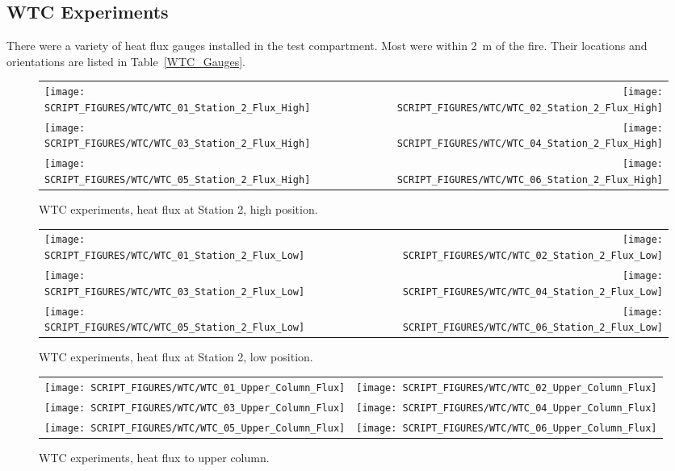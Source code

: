 \clearpage

\subsection{WTC Experiments}

There were a variety of heat flux gauges installed in the test compartment. Most were within 2~m of the fire. Their locations and orientations are listed in Table~\ref{WTC_Gauges}.


\begin{figure}[h!]
\begin{tabular*}{\textwidth}{l@{\extracolsep{\fill}}r}
\texttt{[image: SCRIPT\_FIGURES/WTC/WTC\_01\_Station\_2\_Flux\_High]} &
\texttt{[image: SCRIPT\_FIGURES/WTC/WTC\_02\_Station\_2\_Flux\_High]} \\
\texttt{[image: SCRIPT\_FIGURES/WTC/WTC\_03\_Station\_2\_Flux\_High]} &
\texttt{[image: SCRIPT\_FIGURES/WTC/WTC\_04\_Station\_2\_Flux\_High]} \\
\texttt{[image: SCRIPT\_FIGURES/WTC/WTC\_05\_Station\_2\_Flux\_High]} &
\texttt{[image: SCRIPT\_FIGURES/WTC/WTC\_06\_Station\_2\_Flux\_High]}
\end{tabular*}
\caption{WTC experiments, heat flux at Station 2, high position.}
\label{NIST_WTC_Station_2_Flux_High}
\end{figure}

\newpage

\begin{figure}[p]
\begin{tabular*}{\textwidth}{l@{\extracolsep{\fill}}r}
\texttt{[image: SCRIPT\_FIGURES/WTC/WTC\_01\_Station\_2\_Flux\_Low]} &
\texttt{[image: SCRIPT\_FIGURES/WTC/WTC\_02\_Station\_2\_Flux\_Low]} \\
\texttt{[image: SCRIPT\_FIGURES/WTC/WTC\_03\_Station\_2\_Flux\_Low]} &
\texttt{[image: SCRIPT\_FIGURES/WTC/WTC\_04\_Station\_2\_Flux\_Low]} \\
\texttt{[image: SCRIPT\_FIGURES/WTC/WTC\_05\_Station\_2\_Flux\_Low]} &
\texttt{[image: SCRIPT\_FIGURES/WTC/WTC\_06\_Station\_2\_Flux\_Low]}
\end{tabular*}
\caption{WTC experiments, heat flux at Station 2, low position.}
\label{NIST_WTC_Station_2_Flux_Low}
\end{figure}

\begin{figure}[p]
\begin{tabular*}{\textwidth}{l@{\extracolsep{\fill}}r}
\texttt{[image: SCRIPT\_FIGURES/WTC/WTC\_01\_Upper\_Column\_Flux]} &
\texttt{[image: SCRIPT\_FIGURES/WTC/WTC\_02\_Upper\_Column\_Flux]} \\
\texttt{[image: SCRIPT\_FIGURES/WTC/WTC\_03\_Upper\_Column\_Flux]} &
\texttt{[image: SCRIPT\_FIGURES/WTC/WTC\_04\_Upper\_Column\_Flux]} \\
\texttt{[image: SCRIPT\_FIGURES/WTC/WTC\_05\_Upper\_Column\_Flux]} &
\texttt{[image: SCRIPT\_FIGURES/WTC/WTC\_06\_Upper\_Column\_Flux]}
\end{tabular*}
\caption{WTC experiments, heat flux to upper column.}
\label{NIST_WTC_Upper_Column_Flux}
\end{figure}

